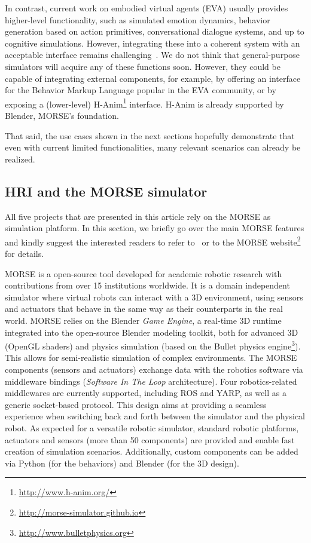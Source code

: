 \documentclass{llncs}
\begin{document}
In contrast, current work on embodied virtual agents (EVA) usually provides
higher-level functionality, such as simulated emotion dynamics, behavior
generation based on action primitives, conversational dialogue systems, and up
to cognitive simulations. However, integrating these into a coherent system with
an acceptable interface remains challenging~\cite{gratch2002creating}. We do not
think that general-purpose simulators will acquire any of these functions soon.
However, they could be capable of integrating external components, for example,
by offering an interface for the Behavior Markup Language
popular in the EVA community, or by exposing a (lower-level)
H-Anim\footnote{\url{http://www.h-anim.org/}} interface. H-Anim is already
supported by Blender, MORSE's foundation.

That said, the use cases shown in the next sections hopefully demonstrate that
even with current limited functionalities, many relevant scenarios can already
be realized.

\subsection*{HRI and the MORSE simulator}

All five projects that are presented in this article rely on the MORSE as
simulation platform. In this section, we briefly go over the main MORSE features
and kindly suggest the interested readers to refer to~\cite{morse_simpar_2012}
or to the MORSE website\footnote{\url{http://morse-simulator.github.io}} for
details.

MORSE is a open-source tool developed for academic robotic research with
contributions from over 15 institutions worldwide. It is a domain independent
simulator where virtual robots can interact with a 3D environment, using sensors
and actuators that behave in the same way as their counterparts in the real
world. MORSE relies on the Blender \emph{Game Engine}, a real-time 3D runtime
integrated into the open-source Blender modeling toolkit, both for advanced 3D
(OpenGL shaders) and physics simulation (based on the {\sc Bullet} physics
engine\footnote{\url{http://www.bulletphysics.org}}). This allows for semi-realistic simulation of complex environments.
The MORSE components (sensors and actuators) exchange data with the robotics
software via middleware bindings (\emph{Software In The Loop} architecture).
Four robotics-related middlewares are currently supported, including ROS and YARP, as
well as a generic socket-based protocol. This design aims at providing a
seamless experience when switching back and forth between the simulator and the
physical robot. As expected for a versatile robotic simulator, standard
robotic platforms, actuators and sensors (more than 50 components) are
provided and enable fast creation of simulation scenarios. Additionally, custom
components can be added via Python (for the behaviors) and Blender (for the 3D
design).
\end{document}
